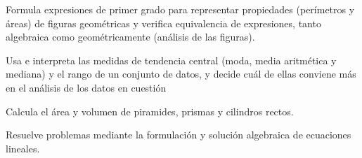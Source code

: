 \item Formula expresiones de primer grado para representar propiedades (perímetros y áreas) de figuras geométricas y verifica equivalencia de expresiones, tanto algebraica como geométricamente (análisis de las figuras).
\item Usa e interpreta las medidas de tendencia central (moda, media aritmética y mediana) y el rango de un conjunto de datos, y decide cuál de ellas conviene más en el análisis de los datos en cuestión
\item Calcula el área y volumen de piramides, prismas y cilindros rectos.
\item Resuelve problemas mediante la formulación y solución algebraica de ecuaciones lineales.